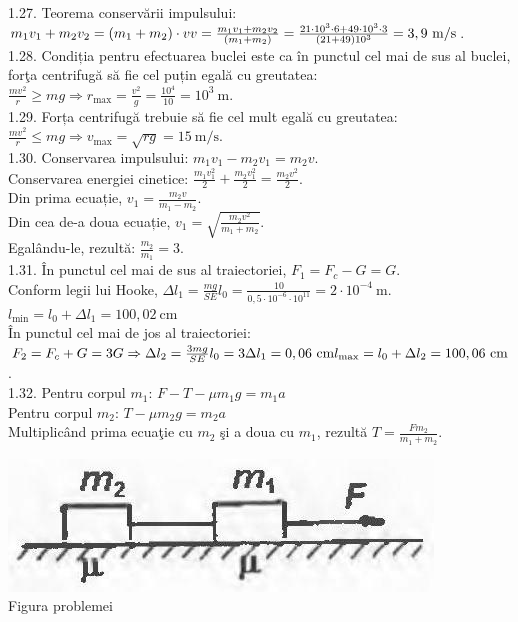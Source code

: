 1.27. Teorema conservării impulsului: $m_{1} v_{1}+m_{2} v_{2}=\left(m_{1}+m_{2}\right) \cdot v\\ v=\frac{m_{1} v_{1}+m_{2} v_{2}}{\left(m_{1}+m_{2}\right)}=\frac{21 \cdot 10^{3} \cdot 6+49 \cdot 10^{3} \cdot 3}{(21+49) 10^{3}}=3,9 \mathrm{~m} / \mathrm{s}$.\\

1.28. Condiția pentru efectuarea buclei este ca în punctul cel mai de sus al buclei, forţa centrifugă să fie cel puțin egală cu greutatea:\\ $\frac{m v^{2}}{r} \geq m g \Rightarrow r_{\max }=\frac{v^{2}}{g}=\frac{10^{4}}{10}=10^{3} \mathrm{~m}$.\\

1.29. Forța centrifugă trebuie să fie cel mult egală cu greutatea:\\ $\frac{m v^{2}}{r} \leq m g \Rightarrow v_{\max }=\sqrt{r g}=15 \mathrm{~m} / \mathrm{s}$.\\

1.30. Conservarea impulsului: $m_{1} v_{1}-m_{2} v_{1}=m_{2} v$.\\ Conservarea energiei cinetice: $\frac{m_{1} v_{1}^{2}}{2}+\frac{m_{2} v_{1}^{2}}{2}=\frac{m_{2} v^{2}}{2}$.\\ Din prima ecuație, $v_{1}=\frac{m_{2} v}{m_{1}-m_{2}}$.\\ Din cea de-a doua ecuație, $v_{1}=\sqrt{\frac{m_{2} v^{2}}{m_{1}+m_{2}}}$.\\ Egalându-le, rezultă: $\frac{m_{2}}{m_{1}}=3$.\\

1.31. În punctul cel mai de sus al traiectoriei, $F_{1}=F_{c}-G=G$.\\ Conform legii lui Hooke, $\Delta l_{1}=\frac{m g}{S E} l_{0}=\frac{10}{0,5 \cdot 10^{-6} \cdot 10^{11}}=2 \cdot 10^{-4} \mathrm{~m}$.\\ $l_{\min }=l_{0}+\Delta l_{1}=100,02 \mathrm{~cm}$\\ În punctul cel mai de jos al traiectoriei:\\ $F_{2}=F_{c}+G=3 G \Rightarrow \Delta l_{2}=\frac{3 m g}{S E} l_{0}=3 \Delta l_{1}=0,06 \mathrm{~cm}\\ l_{\max }=l_{0}+\Delta l_{2}=100,06 \mathrm{~cm}$.\\

1.32. Pentru corpul $m_{1}$: $F-T-\mu m_{1} g=m_{1} a$\\ Pentru corpul $m_{2}$: $T-\mu m_{2} g=m_{2} a$\\ Multiplicând prima ecuaţie cu $m_{2}$ şi a doua cu $m_{1}$, rezultă $T=\frac{F m_{2}}{m_{1}+m_{2}}$.\\ \begin{center} \includegraphics[width=0.4\linewidth]{images/2025_07_01_5b3ff9fa0d508c8e9f17g-203}\\ Figura problemei \end{center}\\

